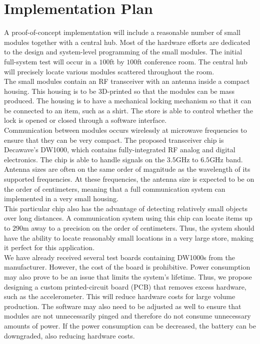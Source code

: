 \documentclass{article}
\begin{document}
\section{Implementation Plan}
A proof-of-concept implementation will include a reasonable number of small modules together with a central hub.
Most of the hardware efforts are dedicated to the design and system-level programming of the small modules.
The initial full-system test will occur in a $100$ft by $100$ft conference room.
The central hub will precisely locate various modules scattered throughout the room. \\

The small modules contain an RF transceiver with an antenna inside a compact housing.
This housing is to be 3D-printed so that the modules can be mass produced.
The housing is to have a mechanical locking mechanism so that it can be connected to an item, such as a shirt.
The store is able to control whether the lock is opened or closed through a software interface. \\

Communication between modules occurs wirelessly at microwave frequencies to ensure that they can be very compact.
The proposed transceiver chip is Decawave's DW1000, which contains fully-integrated RF analog and digital electronics.
The chip is able to handle signals on the $3.5$\si{\giga\hertz} to $6.5$\si{\giga\hertz} band.
Antenna sizes are often on the same order of magnitude as the wavelength of its supported frequencies.
At these frequencies, the antenna size is expected to be on the order of centimeters, meaning that a full communication system can implemented in a very small housing. \\

This particular chip also has the advantage of detecting relatively small objects over long distances.
A communication system using this chip can locate items up to $290$\si{\meter} away to a precision on the order of centimeters.
Thus, the system should have the ability to locate reasonably small locations in a very large store, making it perfect for this application. \\

We have already received several test boards containing DW1000s from the manufacturer.
However, the cost of the board is prohibitive.
Power consumption may also prove to be an issue that limits the system's lifetime.
Thus, we propose designing a custom printed-circuit board (PCB) that removes excess hardware, such as the accelerometer.
This will reduce hardware costs for large volume production.
The software may also need to be adjusted as well to ensure that modules are not unnecessarily pinged and therefore do not consume unnecessary amounts of power.
If the power consumption can be decreased, the battery can be downgraded, also reducing hardware costs. \\
\end{document}
